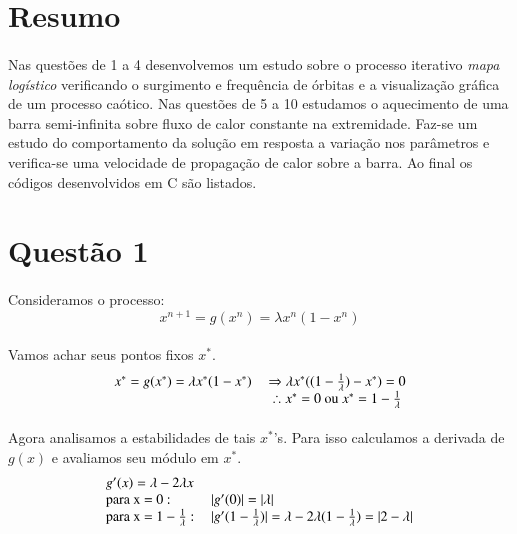 \documentclass[a4paper,11pt]{article}
\begin{document}

\newpage
\thispagestyle{empty}
\mbox{}
\newpage

\section*{Resumo}
\paragraph{}Nas questões de 1 a 4 desenvolvemos um estudo sobre o processo iterativo \emph{mapa logístico} verificando o surgimento e frequência de órbitas e a visualização gráfica de um processo caótico. Nas questões de 5 a 10 estudamos o aquecimento de uma barra semi-infinita sobre fluxo de calor constante na extremidade. Faz-se um estudo do comportamento da solução em resposta a variação nos parâmetros e verifica-se uma velocidade de propagação de calor sobre a barra. Ao final os códigos desenvolvidos em C são listados.

\section*{Questão 1}
\paragraph{} Consideramos o processo:
\begin{equation}
	x^{n+1} = g(x^n) = \lambda x^n(1 - x^n)
\end{equation}
\paragraph{} Vamos achar seus pontos fixos $x^*$.
\begin{displaymath}
	\begin{tabular}{lc}
	

	$x^* = g(x^*) = \lambda x^*(1 - x^*) $	&
	$\Rightarrow \lambda x^*((1 - \frac{1}{\lambda}) - x^*) = 0 $\\
	& $\therefore x^* = 0$ ou $x^* = 1 - \frac{1}{\lambda}$\\
	\end{tabular}
\end{displaymath}

\paragraph{}Agora analisamos a estabilidades de tais $x^*$'s. Para isso calculamos a derivada de $g(x)$ e avaliamos seu módulo em $x^*$.
\begin{displaymath}
	\begin{tabular}{ll}
	$g'(x) = \lambda - 2 \lambda x$ & \\
	para x = 0 : & $|g'(0)| = |\lambda$| \\
	para x = $1 - \frac{1}{\lambda}$ :  &$|g'(1 - \frac{1}{\lambda})| = \lambda - 2 \lambda (1 - \frac{1}{\lambda}) = |2 - \lambda| $	 \\
	\end{tabular}	
\end{displaymath}
\end{document}
